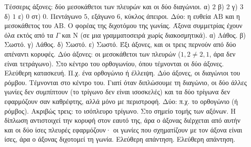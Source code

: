  Τέσσερις άξονες: δύο μεσοκάθετοι των πλευρών και οι δύο διαγώνιοι.
 α) $2$ \quad β) $2$ \quad γ) $3$ \quad δ) $1$ \quad ε) $0$ \quad στ) $0$.
 Πεντάγωνο $5$, εξάγωνο $6$, κύκλος άπειροι.
 Δύο: η ευθεία $\mathrm{ΑΒ}$ και η μεσοκάθετος του $\mathrm{ΑΒ}$.
 Ο φορέας της διχοτόμου της γωνίας.
 Άξονα συμμετρίας έχουν όλα εκτός από τα $\Gamma$ και $\mathrm{Ν}$ (σε μια γραμματοσειρά χωρίς διακοσμητικά).
 α) Λάθος. β) Σωστό. γ) Λάθος. δ) Σωστό. ε) Σωστό.
 Έξι άξονες, και οι τρεις περνούν από δύο απέναντι κορυφές.
 Δύο άξονες: οι μεσοκάθετοι των πλευρών ($1{,}2\neq2{,}1$, άρα δεν είναι τετράγωνο).
 Στο κέντρο του ορθογωνίου, όπου τέμνονται οι δύο άξονες.
 Ελεύθερη κατασκευή. Π.χ. ένα ορθογώνιο ή έλλειψη.
 Δύο άξονες, οι διαγώνιοι του ρόμβου. Τέμνονται στο κέντρο του.
 Γιατί όταν διπλώσουμε τη διαγώνιο, οι δύο άλλες γωνίες δεν συμπίπτουν (το τρίγωνο δεν είναι ισοσκελές) και τα δύο τρίγωνα δεν εφαρμόζουν σαν καθρέφτης, αλλά μόνο με περιστροφή.
 Δύο: π.χ. το ορθογώνιο (ή ρόμβος). Ακριβώς τρεις: το ισόπλευρο τρίγωνο.
 Στο σημείο τομής των αξόνων.
 Η δίπλωση αντιστοιχεί την κορυφή στον εαυτό της, άρα ο άξονας διέρχεται από αυτήν και οι δύο ίσες πλευρές εφαρμόζουν· οι γωνίες που σχηματίζουν με τον άξονα είναι ίσες, άρα ο άξονας διχοτομεί τη γωνία.
 Ελεύθερη απάντηση.
 Ελεύθερη απάντηση.
